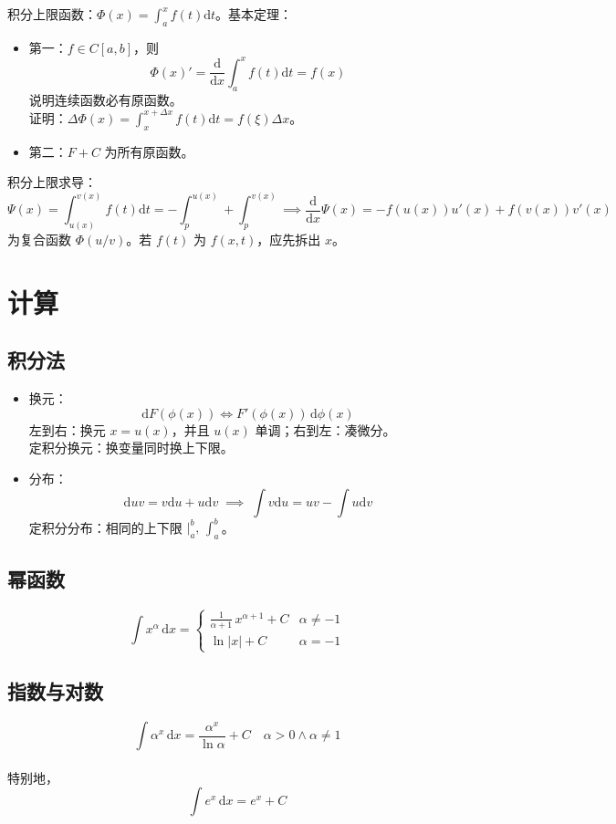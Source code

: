 \documentclass[12pt, a4paper, UTF8, openany]{ctexbook}
\newcommand{\dif}{\mathrm{d}}
\begin{document}
        积分上限函数：$\Phi(x) = \int_{a}^{x} f(t)\dif t$。基本定理：
        \begin{itemize}
            \item 第一：$f \in C[a, b]$，则 $$\Phi(x)' = \frac{\dif}{\dif x}\int_{a}^{x} f(t)\dif t = f(x)$$
                {\heiti 说明连续函数必有原函数}。\\
                证明：$\Delta\Phi(x) = \int_{x}^{x + \Delta x} f(t)\dif t = f(\xi)\Delta x$。
            \item 第二：$F + C$ 为所有原函数。
        \end{itemize}

        {\heiti 积分上限求导}：
        $$\Psi(x) = \int_{u(x)}^{v(x)} f(t)\dif t = -\int_{p}^{u(x)} + \int_{p}^{v(x)} 
        \implies \frac{\dif}{\dif x}\Psi(x) = -f(u(x))u'(x) + f(v(x))v'(x)$$ 
        为复合函数 $\Phi(u/v)$。若 $f(t)$ 为 $f(x, t)$，应先拆出 $x$。
        
    \section{计算}
        \subsection{积分法}
        \begin{itemize}
            \item 换元：$$\dif F(\phi(x)) \iff F'(\phi(x))\,\dif\phi(x)$$
                左到右：换元 $x = u(x)$，并且 $u(x)$ {\heiti 单调}；右到左：凑微分。\\
                定积分换元：换变量同时换上下限。
            \item 分布：$$\dif uv = v\dif u + u\dif v \; \implies \; \int v\dif u = uv - \int u\dif v$$
                定积分分布：相同的上下限 $|_a^b,\, \int_{a}^{b}$。
        \end{itemize}

        \subsection{幂函数}
        $$\int x^\alpha\,\dif x = 
            \begin{cases}
                \frac{1}{\alpha + 1}\, x^{\alpha + 1} + C &\alpha\neq -1 \\
                \ln|x| + C &\alpha = -1
            \end{cases}$$

        \subsection{指数与对数}
        $$\int \alpha^x\,\dif x = \frac{\alpha^x}{\ln\alpha} + C \quad \alpha > 0 \land \alpha \neq 1$$\\
        特别地，$$\int e^x\,\dif x = e^x + C$$
\end{document}
